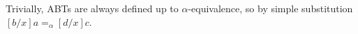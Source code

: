 \documentclass[11pt]{book}
\begin{document}
\begin{enumerate}
	\item[2.1] Give an inductive definition of the judgement $\mathsf{max
\end{enumerate}
\br

Trivially, ABTs are always defined up to $\alpha$-equivalence, so by simple substitution $[b/x]a =_\alpha [d/x]c$.
\end{document}

